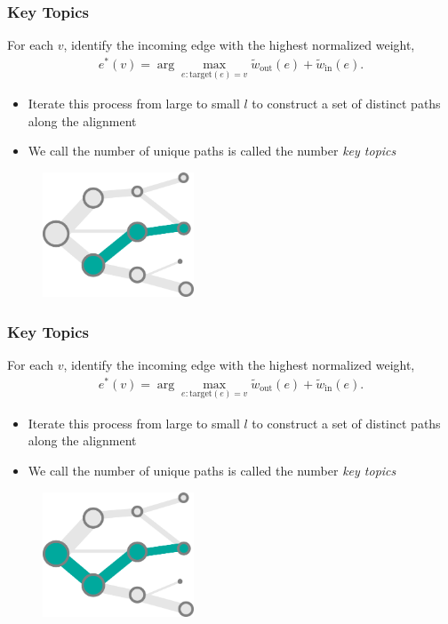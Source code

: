 \documentclass[hyperref={colorlinks=true, linkcolor=violet, citecolor=SeaGreen}]{beamer}
\begin{document}
\begin{frame}
  \frametitle{Key Topics}
  For each $v$, identify the incoming edge with the highest normalized weight,
  \begin{align*}
    e^\ast\left(v\right) = \arg \max_{e : \text{target}\left(e\right) = v} \tilde{w}_{\text{out}}\left(e\right) + \tilde{w}_{\text{in}}\left(e\right).
  \end{align*}
  \begin{itemize}
    \item Iterate this process from large to small $l$ to construct a set of
    distinct paths along the alignment
    \item We call the number of unique paths is called the number \emph{key
    topics}
  \end{itemize}

\begin{figure}
\includegraphics[width=0.4\textwidth]{branch_construction-2}
\end{figure}
\end{frame}

\begin{frame}
  \frametitle{Key Topics}
  For each $v$, identify the incoming edge with the highest normalized weight,
  \begin{align*}
    e^\ast\left(v\right) = \arg \max_{e : \text{target}\left(e\right) = v} \tilde{w}_{\text{out}}\left(e\right) + \tilde{w}_{\text{in}}\left(e\right).
  \end{align*}
  \begin{itemize}
    \item Iterate this process from large to small $l$ to construct a set of
    distinct paths along the alignment
    \item We call the number of unique paths is called the number \emph{key
    topics}
  \end{itemize}

\begin{figure}
\includegraphics[width=0.4\textwidth]{branch_construction-4}
\end{figure}
\end{frame}
\end{document}
